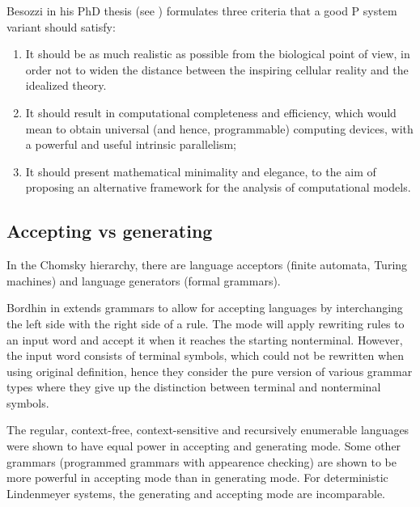 Besozzi in his PhD thesis (see \cite{Besozzi:PhD:2004}) formulates three criteria that a good P system variant should satisfy:

\begin{enumerate}
	\item It should be as much realistic as possible from the biological point of view, in order not to widen the distance between the inspiring cellular reality and the idealized theory.
	\item It should result in computational completeness and efficiency, which would mean to obtain universal (and hence, programmable) computing devices, with a powerful and useful intrinsic parallelism;
	\item It should present mathematical minimality and elegance, to the aim of proposing an alternative framework for the analysis of computational models.
\end{enumerate}

\subsection{Accepting vs generating} %
\label{sub:accepting_vs_generating}

In the Chomsky hierarchy, there are language acceptors (finite automata, Turing machines) and language generators (formal grammars).


Bordhin in \cite{Bordihn99acceptingpure} extends grammars to allow for accepting languages by interchanging the left side with the right side of a rule. The mode will apply rewriting rules to an input word and accept it when it reaches the starting nonterminal. However, the input word consists of terminal symbols, which could not be rewritten when using original definition, hence they consider the pure version of various grammar types where they give up the distinction between terminal and nonterminal symbols.


The regular, context-free, context-sensitive and recursively enumerable languages were shown to have equal power in accepting and generating mode.
Some other grammars (programmed grammars with appearence checking) are shown to be more powerful in accepting mode than in generating mode.
For deterministic Lindenmeyer systems, the generating and accepting mode are incomparable.


